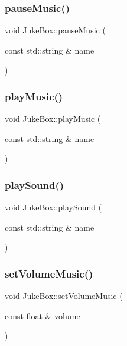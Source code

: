 \mbox{\label{class_juke_box_a0893749f1d5a93edbc1ce1e6eb85131a}} 
\subsubsection{\texorpdfstring{pauseMusic()}{pauseMusic()}}
{\footnotesize\ttfamily void Juke\+Box\+::pause\+Music (\begin{DoxyParamCaption}\item[{const std\+::string \&}]{name }\end{DoxyParamCaption})}

\mbox{\label{class_juke_box_a0c813afba79204a479c7606809352031}} 
\subsubsection{\texorpdfstring{playMusic()}{playMusic()}}
{\footnotesize\ttfamily void Juke\+Box\+::play\+Music (\begin{DoxyParamCaption}\item[{const std\+::string \&}]{name }\end{DoxyParamCaption})}

\mbox{\label{class_juke_box_a6b440cfeb70a1ab8e24185c9d024fd5f}} 
\subsubsection{\texorpdfstring{playSound()}{playSound()}}
{\footnotesize\ttfamily void Juke\+Box\+::play\+Sound (\begin{DoxyParamCaption}\item[{const std\+::string \&}]{name }\end{DoxyParamCaption})}

\mbox{\label{class_juke_box_a349531586d25c156c5d3829214b30ee3}} 
\subsubsection{\texorpdfstring{setVolumeMusic()}{setVolumeMusic()}}
{\footnotesize\ttfamily void Juke\+Box\+::set\+Volume\+Music (\begin{DoxyParamCaption}\item[{const float \&}]{volume }\end{DoxyParamCaption})}

